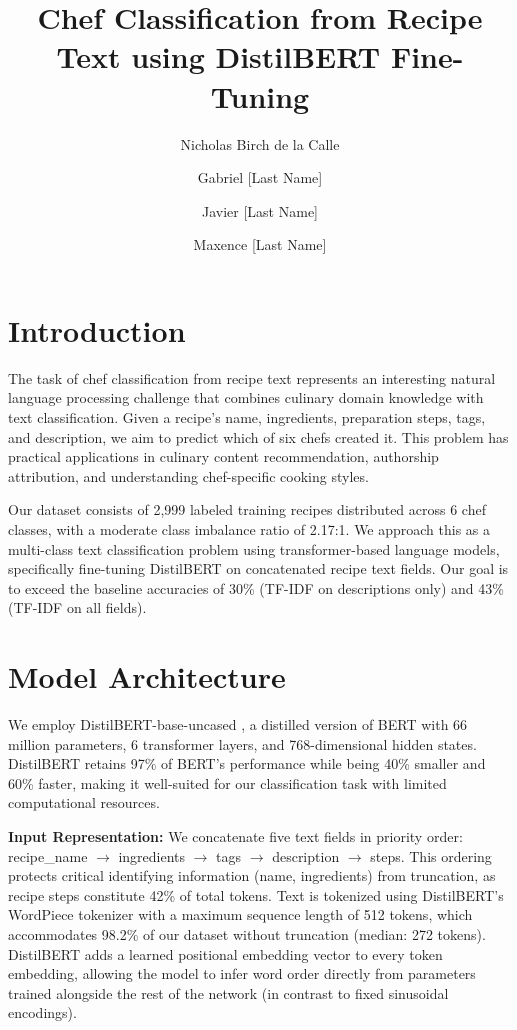 \documentclass[twocolumn,10pt]{article}
\title{Chef Classification from Recipe Text using DistilBERT Fine-Tuning}
\author{Nicholas Birch de la Calle}
\author{Gabriel [Last Name]}
\author{Javier [Last Name]}
\author{Maxence [Last Name]}
\affil{Group 2\\ Instituto Superior Técnico, Universidade de Lisboa}
\begin{document}
\maketitle

\section{Introduction}

The task of chef classification from recipe text represents an interesting natural language processing challenge that combines culinary domain knowledge with text classification. Given a recipe's name, ingredients, preparation steps, tags, and description, we aim to predict which of six chefs created it. This problem has practical applications in culinary content recommendation, authorship attribution, and understanding chef-specific cooking styles.

Our dataset consists of 2,999 labeled training recipes distributed across 6 chef classes, with a moderate class imbalance ratio of 2.17:1. We approach this as a multi-class text classification problem using transformer-based language models, specifically fine-tuning DistilBERT on concatenated recipe text fields. Our goal is to exceed the baseline accuracies of 30\% (TF-IDF on descriptions only) and 43\% (TF-IDF on all fields).

\section{Model Architecture}

We employ DistilBERT-base-uncased \cite{sanh2019distilbert}, a distilled version of BERT with 66 million parameters, 6 transformer layers, and 768-dimensional hidden states. DistilBERT retains 97\% of BERT's performance while being 40\% smaller and 60\% faster, making it well-suited for our classification task with limited computational resources.

\textbf{Input Representation:} We concatenate five text fields in priority order: recipe\_name $\rightarrow$ ingredients $\rightarrow$ tags $\rightarrow$ description $\rightarrow$ steps. This ordering protects critical identifying information (name, ingredients) from truncation, as recipe steps constitute 42\% of total tokens. Text is tokenized using DistilBERT's WordPiece tokenizer with a maximum sequence length of 512 tokens, which accommodates 98.2\% of our dataset without truncation (median: 272 tokens). DistilBERT adds a learned positional embedding vector to every token embedding, allowing the model to infer word order directly from parameters trained alongside the rest of the network (in contrast to fixed sinusoidal encodings).
\end{document}
